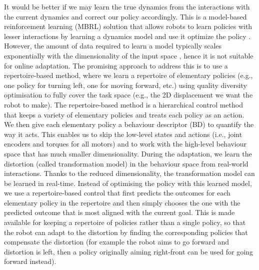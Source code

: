 \documentclass[journal]{IEEEtran}
\begin{document}
It would be better if we may learn the true dynamics from the interactions with the current dynamics and
correct our policy accordingly. This is a model-based reinforcement learning (MBRL) solution that allows robots to learn policies with lesser interactions by learning a dynamics model and use it optimize the policy \cite{MBRL, black_box_search, policy_search}. 
However, the amount of data required to learn a model typically scales exponentially with the dimensionality of the input space \cite{curse_of_dim}, hence it is not suitable for online adaptation. 
The promising approach to address this is to use a repertoire-based method, where we learn a repertoire of elementary policies (e.g., one policy for turning left, one for moving forward, etc.) using quality diversity optimisation \cite{QD} to fully cover the task space (e.g., the 2D displacement we want the robot to make). 
The repertoire-based method is a hierarchical control method that keeps a variety of elementary policies and treats each policy as an action. 
We then give each elementary policy a behaviour descriptor (BD) to quantify the way it acts.
This enables us to skip the low-level states and actions (i.e., joint encoders and torques for all motors) and to work with the high-level behaviour space that has much smaller dimensionality.
During the adaptation, we learn the distortion (called transformation model) in the behaviour space from real-world interactions. Thanks to the reduced dimensionality, the transformation model can be learned in real-time.
Instead of optimising the policy with this learned model, we use a repertoire-based control that first predicts the outcomes for each elementary policy in the repertoire and then simply chooses the one with the predicted outcome that is most aligned with the current goal. 
This is made available for keeping a repertoire of policies rather than a single policy, so that the robot can adapt to the distortion by finding the corresponding policies that compensate the distortion (for example the robot aims to go forward and distortion is left, then a policy originally aiming right-front can be used for going forward instead).
\end{document}
